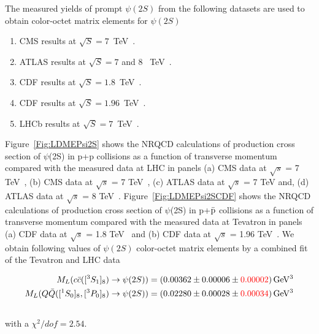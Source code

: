 \documentclass[aps,prc,preprint,superscriptaddress,showpacs,showkeys,amsmath]{revtex4-1}
\begin{document}
The measured yields of prompt $\psi(2S)$ from the following datasets
are used to obtain color-octet matrix elements for $\psi(2S)$ 
\begin{enumerate}
\item{CMS results at $\sqrt{S}=7$~TeV~\cite{Chatrchyan:2011kc,Khachatryan:2015rra}}.
\item{ATLAS results at $\sqrt{S}=7$ and 8 ~TeV~\cite{Aad:2015duc}}.
\item{CDF results at $\sqrt{S}=1.8$~TeV~\cite{Abe:1997jz}}.
\item{CDF results at $\sqrt{S}=1.96$~TeV~\cite{Acosta:2004yw}}.
\item{LHCb results at $\sqrt{S}=7$~TeV~\cite{Aaij:2012ag}}.
\end{enumerate}
Figure~\ref{Fig:LDMEPsi2S} shows the NRQCD calculations of production cross section of 
$\psi$(2S) in p+p collisions as a function of transverse momentum compared with the 
measured data at LHC in panels
(a) CMS data at $\sqrt{s}$ = 7 TeV~\cite{Chatrchyan:2011kc},
(b) CMS data at $\sqrt{s}$ = 7 TeV~\cite{Khachatryan:2015rra}, 
(c) ATLAS data at $\sqrt{s}$ = 7 TeV and, 
(d) ATLAS data at $\sqrt{s}$ = 8 TeV~\cite{Aad:2015duc}. 
 Figure~\ref{Fig:LDMEPsi2SCDF} shows the NRQCD calculations of production cross section 
of $\psi$(2S) in p+{$\bar {\rm p}$} collisions as a function of transverse momentum compared 
with the measured data at Tevatron in panels (a) CDF data at $\sqrt{s}$ = 1.8 TeV~\cite{Abe:1997jz} 
and (b) CDF data at $\sqrt{s}$ = 1.96 TeV~\cite{Acosta:2004yw}. 
We obtain following values of $\psi(2S)$ color-octet matrix elements by a combined fit of 
the Tevatron and LHC data   

\begin{equation}
  \begin{split}
    M_{L}(c{\bar{c}}([^3S_1]_{8})\rightarrow \psi(2S)) &= (0.00362\pm 0.00006 \pm {\color{red} 0.00002}) \, {\rm GeV^3}\\
    M_{L}(Q{\bar{Q}}([^1S_0]_{8},[^3P_0]_{8})\rightarrow \psi(2S)) &= (0.02280\pm 0.00028 \pm {\color{red}0.00034}) \,{\rm GeV^3}\\
     ~\label{eq:COLDME_Psi}
  \end{split}
\end{equation}
with a {\color{red}$\chi^2/dof=2.54$}. 
\end{document}
